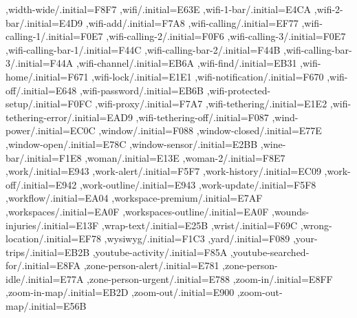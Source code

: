 { ,width-wide/.initial=F8F7
 ,wifi/.initial=E63E
 ,wifi-1-bar/.initial=E4CA
 ,wifi-2-bar/.initial=E4D9
 ,wifi-add/.initial=F7A8
 ,wifi-calling/.initial=EF77
 ,wifi-calling-1/.initial=F0E7
 ,wifi-calling-2/.initial=F0F6
 ,wifi-calling-3/.initial=F0E7
 ,wifi-calling-bar-1/.initial=F44C
 ,wifi-calling-bar-2/.initial=F44B
 ,wifi-calling-bar-3/.initial=F44A
 ,wifi-channel/.initial=EB6A
 ,wifi-find/.initial=EB31
 ,wifi-home/.initial=F671
 ,wifi-lock/.initial=E1E1
 ,wifi-notification/.initial=F670
 ,wifi-off/.initial=E648
 ,wifi-password/.initial=EB6B
 ,wifi-protected-setup/.initial=F0FC
 ,wifi-proxy/.initial=F7A7
 ,wifi-tethering/.initial=E1E2
 ,wifi-tethering-error/.initial=EAD9
 ,wifi-tethering-off/.initial=F087
 ,wind-power/.initial=EC0C
 ,window/.initial=F088
 ,window-closed/.initial=E77E
 ,window-open/.initial=E78C
 ,window-sensor/.initial=E2BB
 ,wine-bar/.initial=F1E8
 ,woman/.initial=E13E
 ,woman-2/.initial=F8E7
 ,work/.initial=E943
 ,work-alert/.initial=F5F7
 ,work-history/.initial=EC09
 ,work-off/.initial=E942
 ,work-outline/.initial=E943
 ,work-update/.initial=F5F8
 ,workflow/.initial=EA04
 ,workspace-premium/.initial=E7AF
 ,workspaces/.initial=EA0F
 ,workspaces-outline/.initial=EA0F
 ,wounds-injuries/.initial=E13F
 ,wrap-text/.initial=E25B
 ,wrist/.initial=F69C
 ,wrong-location/.initial=EF78
 ,wysiwyg/.initial=F1C3
 ,yard/.initial=F089
 ,your-trips/.initial=EB2B
 ,youtube-activity/.initial=F85A
 ,youtube-searched-for/.initial=E8FA
 ,zone-person-alert/.initial=E781
 ,zone-person-idle/.initial=E77A
 ,zone-person-urgent/.initial=E788
 ,zoom-in/.initial=E8FF
 ,zoom-in-map/.initial=EB2D
 ,zoom-out/.initial=E900
 ,zoom-out-map/.initial=E56B
}